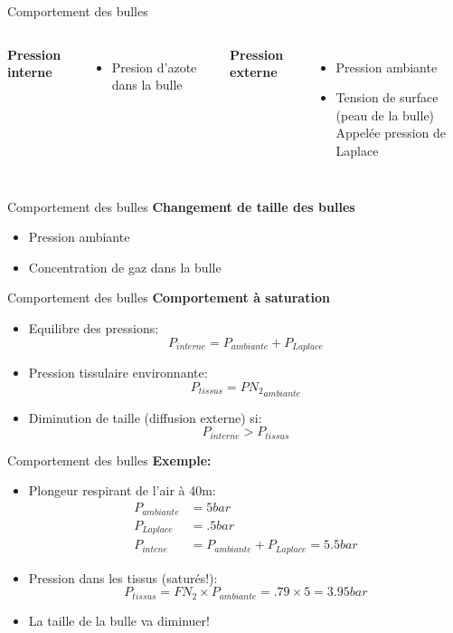 \begin{frame}{Comportement des bulles}
    \begin{columns} %

		\textbf{Pression interne}
		\begin{itemize}
			\item Presion d'azote dans la bulle
		\end{itemize}

		\vspace{1em}
		
		\textbf{Pression externe}
		\begin{itemize}
			\item Pression ambiante
			\item Tension de surface (peau de la bulle)\\Appelée pression de Laplace
		\end{itemize}
    \end{columns}
\end{frame}

\begin{frame}{Comportement des bulles}
	\textbf{Changement de taille des bulles}
		\begin{itemize}
			\item Pression ambiante
			\item Concentration de gaz dans la bulle
		\end{itemize}
\end{frame}

\begin{frame}{Comportement des bulles}  
	\textbf{Comportement à saturation}
	\begin{itemize}
		\item Equilibre des pressions:$$P_{interne} = P_{ambiante}+P_{Laplace}$$ \pause
		\item Pression tissulaire environnante:$$P_{tissus}= PN{_2}_{ambiante}$$ \pause
		\item Diminution de taille (diffusion externe) si: $$P_{interne} > P_{tissus}$$
	\end{itemize}
\end{frame}

\begin{frame}{Comportement des bulles}  
	\textbf{Exemple:}
	\begin{itemize}
		\item Plongeur respirant de l'air à 40m:
				\begin{align*}
					P_{ambiante} &= 5 bar\\
					P_{Laplace} &= .5 bar\\
					P_{intene} &= P_{ambiante} + P_{Laplace} = 5.5 bar
				\end{align*} \pause

		\item Pression dans les tissus (saturés!):
				$$P_{tissus} = FN_2 \times P_{ambiante} = .79 \times 5 =3.95 bar $$ \pause

		\item La taille de la bulle va diminuer!
	\end{itemize}
\end{frame}

